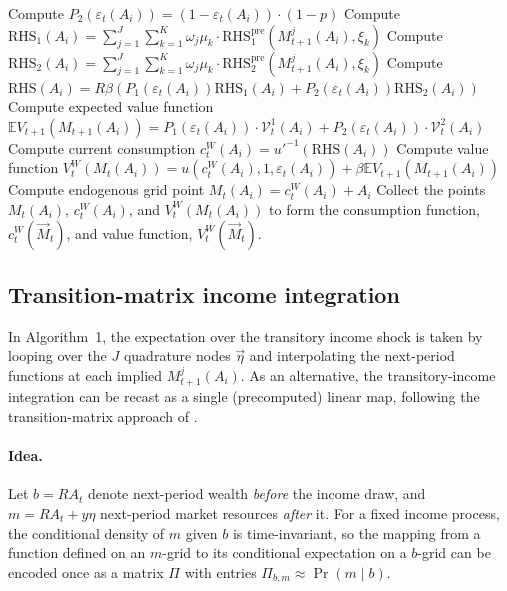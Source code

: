 \documentclass[11pt]{article}
\newcommand{\eff}{\varepsilon}
\newcommand{\goth}[1]{\mathcal{#1}}   %
\newcommand{\E}{\mathbb{E}}
\begin{document}
\begin{algorithm}[htbp]
{    Compute $P_2(\eff_t(A_i)) = (1 - \eff_t(A_i)) \cdot (1 - p)$\;
    Compute $\mathrm{RHS}_1(A_i) = \sum_{j=1}^{J} \sum_{k=1}^{K} \omega_j \mu_k \cdot \mathrm{RHS}_1^{\mathrm{pre}}(M_{t+1}^j(A_i), \xi_k)$\;
    Compute $\mathrm{RHS}_2(A_i) = \sum_{j=1}^{J} \sum_{k=1}^{K} \omega_j \mu_k \cdot \mathrm{RHS}_2^{\mathrm{pre}}(M_{t+1}^j(A_i), \xi_k)$\;
    Compute $\mathrm{RHS}(A_i) = R\beta (P_1(\eff_t(A_i)) \mathrm{RHS}_1(A_i) + P_2(\eff_t(A_i)) \mathrm{RHS}_2(A_i))$\;
    Compute expected value function $\E V_{t+1}(M_{t+1}(A_i)) = P_1(\eff_t(A_i)) \cdot \goth{V}_t^1(A_i) + P_2(\eff_t(A_i)) \cdot \goth{V}_t^2(A_i)$\;
    Compute current consumption $c_t^{W}(A_i) = u'^{-1}(\mathrm{RHS}(A_i))$\;
    Compute value function $V_t^{W}(M_t(A_i)) = u(c_t^{W}(A_i), 1, \eff_t(A_i)) + \beta \E V_{t+1}(M_{t+1}(A_i))$\;
    Compute endogenous grid point $M_t(A_i) = c_t^{W}(A_i) + A_i$\;
}
Collect the points $M_t(A_i)$, $c_t^{W}(A_i)$, and $V_t^{W}(M_t(A_i))$ to form the consumption function, $c_t^{W}(\vec{M}_t)$, and value function, $V_t^{W}(\vec{M}_t)$.\;
\end{algorithm}

\subsection{Transition-matrix income integration}
\label{sec:tranmatrix}

In Algorithm~1, the expectation over the transitory income shock is taken by looping over
the $J$ quadrature nodes $\vec{\eta}$ and interpolating the next-period functions at each
implied $M_{t+1}^j(A_i)$. As an alternative, the transitory-income integration can be
recast as a single (precomputed) linear map, following the transition-matrix approach of
\citet{white2015}.

\paragraph{Idea.}
Let $b = R A_t$ denote next-period wealth \emph{before} the income draw, and
$m = R A_t + y\eta$ next-period market resources \emph{after} it. For a fixed income
process, the conditional density of $m$ given $b$ is time-invariant, so the mapping from a
function defined on an $m$-grid to its conditional expectation on a $b$-grid can be encoded
once as a matrix $\Pi$ with entries $\Pi_{b,m} \approx \Pr(m \mid b)$.
\end{document}

